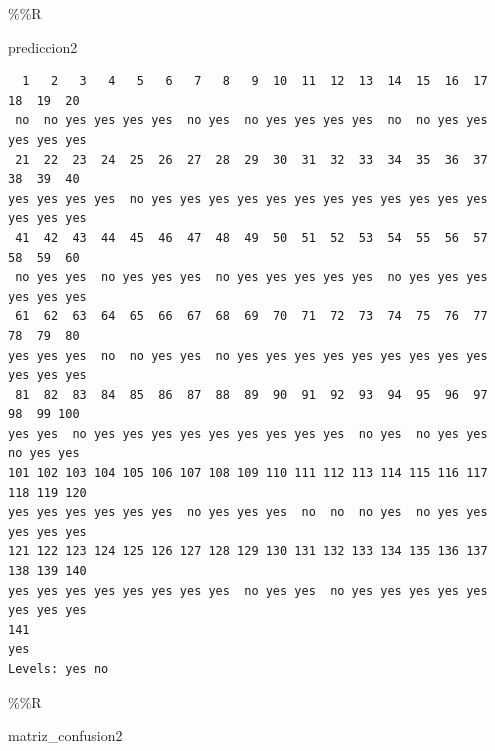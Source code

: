 \documentclass[
  11pt,
  a4paper,
]{article}
\newenvironment{Shaded}{\begin{snugshade}}{\end{snugshade}}
\newcommand{\NormalTok}[1]{#1}
\newcommand{\SpecialCharTok}[1]{\textcolor[rgb]{0.00,0.00,0.00}{#1}}
\begin{document}
\begin{Shaded}
\begin{Highlighting}[]
\SpecialCharTok{\%\%}\NormalTok{R}

\NormalTok{prediccion2}
\end{Highlighting}
\end{Shaded}

\begin{verbatim}
  1   2   3   4   5   6   7   8   9  10  11  12  13  14  15  16  17  18  19  20 
 no  no yes yes yes yes  no yes  no yes yes yes yes  no  no yes yes yes yes yes 
 21  22  23  24  25  26  27  28  29  30  31  32  33  34  35  36  37  38  39  40 
yes yes yes yes  no yes yes yes yes yes yes yes yes yes yes yes yes yes yes yes 
 41  42  43  44  45  46  47  48  49  50  51  52  53  54  55  56  57  58  59  60 
 no yes yes  no yes yes yes  no yes yes yes yes yes  no yes yes yes yes yes yes 
 61  62  63  64  65  66  67  68  69  70  71  72  73  74  75  76  77  78  79  80 
yes yes yes  no  no yes yes  no yes yes yes yes yes yes yes yes yes yes yes yes 
 81  82  83  84  85  86  87  88  89  90  91  92  93  94  95  96  97  98  99 100 
yes yes  no yes yes yes yes yes yes yes yes yes  no yes  no yes yes  no yes yes 
101 102 103 104 105 106 107 108 109 110 111 112 113 114 115 116 117 118 119 120 
yes yes yes yes yes yes  no yes yes yes  no  no  no yes  no yes yes yes yes yes 
121 122 123 124 125 126 127 128 129 130 131 132 133 134 135 136 137 138 139 140 
yes yes yes yes yes yes yes yes  no yes yes  no yes yes yes yes yes yes yes yes 
141 
yes 
Levels: yes no
\end{verbatim}

\newpage

\begin{Shaded}
\begin{Highlighting}[]
\SpecialCharTok{\%\%}\NormalTok{R}

\NormalTok{matriz\_confusion2}
\end{Highlighting}
\end{Shaded}
\end{document}
